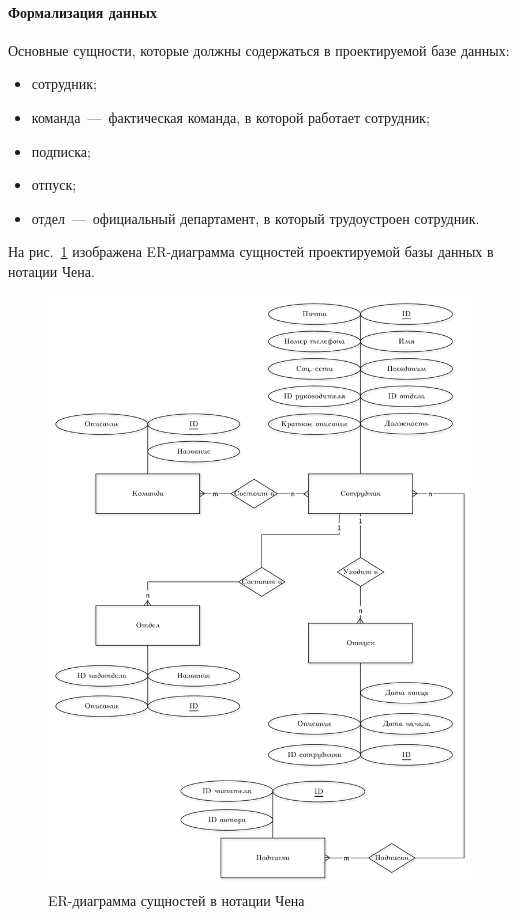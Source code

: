 

\paragraph{Формализация данных} \mbox{}

Основные сущности, которые должны содержаться в проектируемой базе данных:

\begin{itemize}
	\item сотрудник;
	\item команда~---~фактическая команда, в которой работает сотрудник;
	\item подписка;
	\item отпуск;
	\item отдел~---~официальный департамент, в который трудоустроен сотрудник.
\end{itemize}

На рис.~\ref{img:chen} изображена ER-диаграмма сущностей проектируемой базы данных в нотации Чена.

\newpage

\begin{figure}[h!]
\centering
    \includegraphics[width=0.9\linewidth]{assets/chen.pdf}
    \caption{ER-диаграмма сущностей в нотации Чена}
    \label{img:chen}	
\end{figure}


